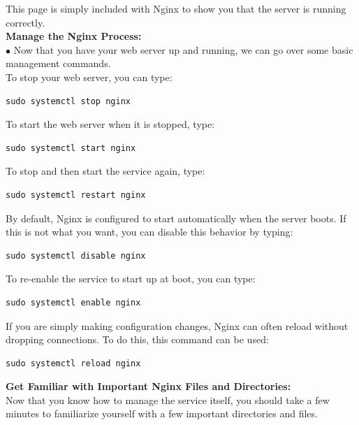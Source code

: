 \documentclass[journal,12pt,onecolumn]{IEEEtran}
\begin{document}
\begin{flushleft}
This page is simply included with Nginx to show you that the server is running correctly.\\
\medskip
\textbf{Manage the Nginx Process:} \\
$\bullet$ Now that you have your web server up and running, we can go over some basic management commands.\\
\medskip
To stop your web server, you can type:\\
\medskip
\begin{lstlisting}[frame=single,linewidth=7cm,breaklines=true]
sudo systemctl stop nginx
\end{lstlisting}
\bigskip
\medskip
To start the web server when it is stopped, type:\\
\medskip
\begin{lstlisting}[frame=single,linewidth=10cm,breaklines=true]
sudo systemctl start nginx
\end{lstlisting}
\bigskip
\medskip
To stop and then start the service again, type:\\
\medskip
\begin{lstlisting}[frame=single,linewidth=10cm,breaklines=true]
sudo systemctl restart nginx
\end{lstlisting}
\bigskip
\medskip
By default, Nginx is configured to start automatically when the server boots. If this is not what you want, you can disable this behavior by typing: \\
\medskip
\begin{lstlisting}[frame=single,linewidth=10cm,breaklines=true]
sudo systemctl disable nginx
\end{lstlisting}
\bigskip
\medskip
To re-enable the service to start up at boot, you can type:\\
\medskip
\begin{lstlisting}[frame=single,linewidth=10cm,breaklines=true]
sudo systemctl enable nginx
\end{lstlisting}
\bigskip
\medskip
If you are simply making configuration changes, Nginx can often reload without dropping connections. To do this, this command can be used:\\
\medskip
\begin{lstlisting}[frame=single,linewidth=9cm,breaklines=true]
sudo systemctl reload nginx
\end{lstlisting}
\bigskip

\textbf{Get Familiar with Important Nginx Files and Directories:} \\
Now that you know how to manage the service itself, you should take a few minutes to familiarize yourself with a few important directories and files.\\


\end{flushleft}
\end{document}
